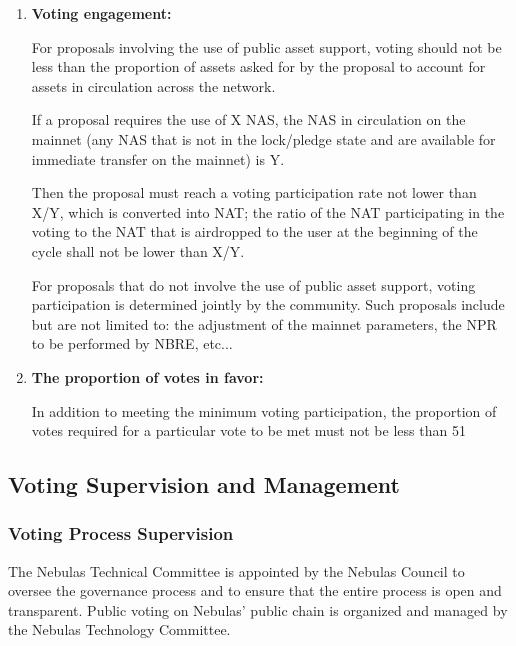 \begin{enumerate}
	\item 

	\textbf{Voting engagement:}

	For proposals involving the use of public asset support, voting should not be less than the proportion of assets asked for by the proposal to account for assets in circulation across the network.

	If a proposal requires the use of X NAS, the NAS in circulation on the mainnet (any NAS that is not in the lock/pledge state and are available for immediate transfer on the mainnet) is Y.

	Then the proposal must reach a voting participation rate not lower than X/Y, which is converted into NAT; the ratio of the NAT participating in the voting to the NAT that is airdropped to the user at the beginning of the cycle shall not be lower than X/Y.

	For proposals that do not involve the use of public asset support, voting participation is determined jointly by the community. Such proposals include but are not limited to: the adjustment of the mainnet parameters, the NPR to be performed by NBRE, etc...

	\item

	\textbf{The proportion of votes in favor:}

	In addition to meeting the minimum voting participation, the proportion of votes required for a particular vote to be met must not be less than 51%
	
\end{enumerate}

\subsection{Voting Supervision and Management}

\subsubsection{Voting Process Supervision}
\label{Second-vote}

The Nebulas Technical Committee is appointed by the Nebulas Council to oversee the governance process and to ensure that the entire process is open and transparent. Public voting on Nebulas' public chain is organized and managed by the Nebulas Technology Committee.

